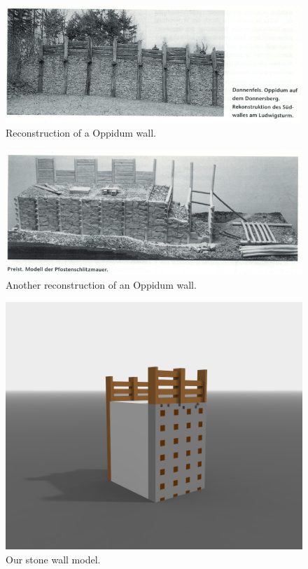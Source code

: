\begin{figure}[ht]
	\centering
	\includegraphics[width=\linewidth]{pictures/scan_rieckhoff_wall1.png}
	\caption{Reconstruction of a Oppidum wall.}
\end{figure}

\begin{figure}[ht]
	\centering
	\includegraphics[width=\linewidth]{pictures/scan_rieckhoff_wall2.png}
	\caption{Another reconstruction of an Oppidum wall.}
\end{figure}

\begin{figure}[ht]
	\centering
	\includegraphics[width=\linewidth]{pictures/stone_wall.png}
	\caption{Our stone wall model.}
\end{figure}
